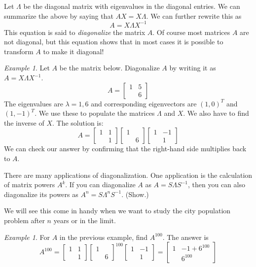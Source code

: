 \documentclass[11pt,oneside]{amsbook}
\theoremstyle{definition}
\theoremstyle{plain}
\theoremstyle{definition}
\theoremstyle{remark}
\newtheorem{example}[theorem]{Example}
\numberwithin{equation}{section}
\numberwithin{figure}{section}
\begin{document}
Let $\Lambda$ be the diagonal matrix with eigenvalues in the diagonal entries. We can summarize the above by saying that $AX=X\Lambda$. We can further rewrite this as
\[A=X\Lambda X^{-1}
\]
This equation is said to \emph{diagonalize} the matrix $A$. Of course most matrices $A$ are not diagonal, but this equation shows that in most cases it is possible to transform $A$ to make it diagonal!

\begin{example}
  Let $A$ be the matrix below. Diagonalize $A$ by writing it as $A=X\Lambda X^{-1}$.
  \[A=\begin{bmatrix}1&5\\&6\end{bmatrix}
  \]
  The eigenvalues are $\lambda=1,6$ and corresponding eigenvectors are $(1,0)^T$ and $(1,-1)^T$. We use these to populate the matrices $\Lambda$ and $X$. We also have to find the inverse of $X$. The solution is:
  \[A=\begin{bmatrix}1&1\\&1\end{bmatrix}
    \begin{bmatrix}1&\\&6\end{bmatrix}
    \begin{bmatrix}1&-1\\&1\end{bmatrix}
  \]
  We can check our answer by confirming that the right-hand side multiplies back to $A$.
\end{example}

There are many applications of diagonalization. One application is the calculation of matrix powers $A^k$. If you can diagonalize $A$ as $A=S\Lambda S^{-1}$, then you can also diagonalize its powers as $A^n=S\Lambda^nS^{-1}$. (Show.)

We will see this come in handy when we want to study the city population problem after $n$ years or in the limit.

\begin{example}
  For $A$ in the previous example, find $A^{100}$. The answer is
  \[A^{100}=\begin{bmatrix}1&1\\&1\end{bmatrix}
    \begin{bmatrix}1&\\&6\end{bmatrix}^{100}
    \begin{bmatrix}1&-1\\&1\end{bmatrix}
    =\begin{bmatrix}1&-1+6^{100}\\&6^{100}\end{bmatrix}
  \]
\end{example}
\end{document}
